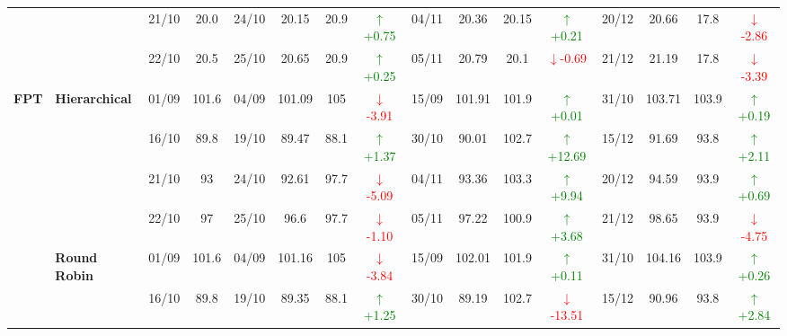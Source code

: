 {\begin{longtable}{llcc|cccc|cccc|cccc}
&
& 21/10 & 20.0 & 24/10 & 20.15 & 20.9 & \textcolor{green}{\(\uparrow\)+0.75} & 04/11 & 20.36 & 20.15 & \textcolor{green}{\(\uparrow\)+0.21} & 20/12 & 20.66 & 17.8 & \textcolor{red}{\(\downarrow\)-2.86} \\

&
& 22/10 & 20.5 & 25/10 & 20.65 & 20.9 & \textcolor{green}{\(\uparrow\)+0.25} & 05/11 & 20.79 & 20.1 & \textcolor{red}{\(\downarrow\)-0.69} & 21/12 & 21.19 & 17.8 & \textcolor{red}{\(\downarrow\)-3.39} \\
\midrule



\multirow{12}{*}{\textbf{FPT}} 
& \textbf{Hierarchical}
& 01/09 & 101.6 & 04/09 & 101.09 & 105 & \textcolor{red}{\(\downarrow\)-3.91} & 15/09 & 101.91 & 101.9 & \textcolor{green}{\(\uparrow\)+0.01} & 31/10 & 103.71 & 103.9 & \textcolor{green}{\(\uparrow\)+0.19} \\

&
& 16/10 & 89.8 & 19/10 & 89.47 & 88.1 & \textcolor{green}{\(\uparrow\)+1.37} & 30/10 & 90.01 & 102.7 & \textcolor{green}{\(\uparrow\)+12.69} & 15/12 & 91.69 & 93.8 & \textcolor{green}{\(\uparrow\)+2.11} \\

&
& 21/10 & 93 & 24/10 & 92.61 & 97.7 & \textcolor{red}{\(\downarrow\)-5.09} & 04/11 & 93.36 & 103.3 & \textcolor{green}{\(\uparrow\)+9.94} & 20/12 & 94.59 & 93.9 & \textcolor{green}{\(\uparrow\)+0.69} \\

&
& 22/10 & 97 & 25/10 & 96.6 & 97.7 & \textcolor{red}{\(\downarrow\)-1.10} & 05/11 & 97.22 & 100.9 & \textcolor{green}{\(\uparrow\)+3.68} & 21/12 & 98.65 & 93.9 & \textcolor{red}{\(\downarrow\)-4.75} \\
\cmidrule(lr){2-16}


& \textbf{Round Robin}
& 01/09 & 101.6 & 04/09 & 101.16 & 105 & \textcolor{red}{\(\downarrow\)-3.84} & 15/09 & 102.01 & 101.9 & \textcolor{green}{\(\uparrow\)+0.11} & 31/10 & 104.16 & 103.9 & \textcolor{green}{\(\uparrow\)+0.26} \\

&
& 16/10 & 89.8 & 19/10 & 89.35 & 88.1 & \textcolor{green}{\(\uparrow\)+1.25} & 30/10 & 89.19 & 102.7 & \textcolor{red}{\(\downarrow\)-13.51} & 15/12 & 90.96 & 93.8 & \textcolor{green}{\(\uparrow\)+2.84} \\


\end{longtable}}
